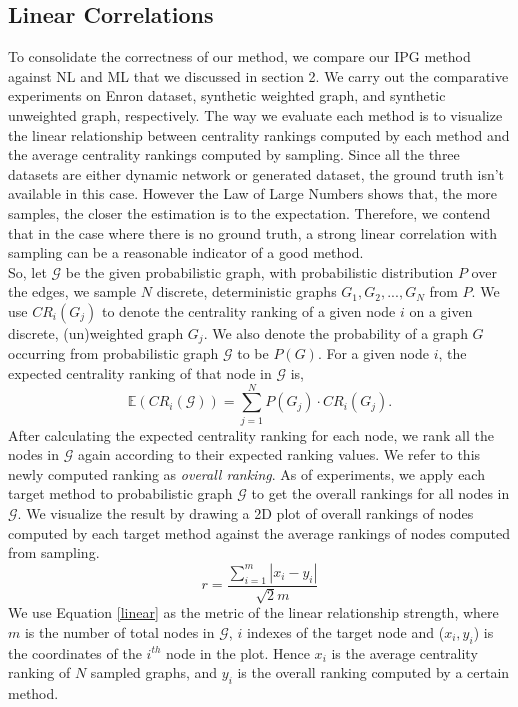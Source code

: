 \documentclass[\main/thesis.tex]{subfiles}
\begin{document}
\subsection{Linear Correlations}
To consolidate the correctness of our method, we compare our IPG method against NL and ML that we discussed in section 2. We carry out the comparative experiments on Enron dataset, synthetic weighted graph, and synthetic unweighted graph, respectively. The way we evaluate each method is to visualize the linear relationship between centrality rankings computed by each method and the average centrality rankings computed by sampling. Since all the three datasets are either dynamic network or generated dataset, the ground truth isn't available in this case. However the Law of Large Numbers shows that, the more samples, the closer the estimation is to the expectation. Therefore, we contend that in the case where there is no ground truth, a strong linear correlation with sampling can be a reasonable indicator of a good method. \\
So, let $\mathcal{G}$ be the given probabilistic graph, with probabilistic distribution $P$ over the edges, we sample $N$ discrete, deterministic graphs $G_1, G_2, ..., G_N$ from $P$. We use $CR_{i}(G_{j})$ to denote the centrality ranking of a given node $i$ on a given discrete, (un)weighted graph $G_{j}$. We also denote the probability of a graph $G$ occurring from probabilistic graph $\mathcal{G}$ to be $P(G)$. For a given node $i$, the expected centrality ranking of that node in $\mathcal{G}$ is,
\begin{equation}
\mathbb{E}(CR_{i}(\mathcal{G})) = \sum_{j=1}^{N}{P(G_j)}\cdot CR_{i}(G_j).
\end{equation}
After calculating the expected centrality ranking for each node, we rank all the nodes in $\mathcal{G}$ again according to their expected ranking values. We refer to this newly computed ranking as \textit{overall ranking}. As of experiments, we apply each target method to probabilistic graph $\mathcal{G}$ to get the overall rankings for all nodes in $\mathcal{G}$. We visualize the result by drawing a 2D plot of overall rankings of nodes computed by each target method against the average rankings of nodes computed from sampling. 
\begin{equation}
r = \frac{\sum_{i=1}^{m} |x_i - y_i|}{\sqrt{2}m} \label{linear}
\end{equation}
We use Equation \ref{linear} as the metric of the linear relationship strength, where $m$ is the number of total nodes in $\mathcal{G}$, $i$ indexes of the target node and ($x_i, y_i$) is the coordinates of the $i^{th}$ node in the plot. Hence $x_i$ is  the average centrality ranking of $N$ sampled graphs, and $y_i$ is the overall ranking computed by a certain method.
\end{document}
